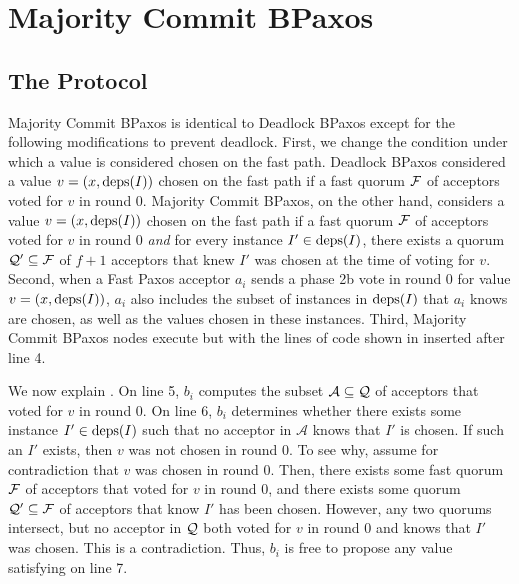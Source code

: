 \section{Majority Commit BPaxos}
\subsection{The Protocol}
Majority Commit BPaxos is identical to Deadlock BPaxos except for the following
modifications to prevent deadlock.
%
First, we change the condition under which a value is considered chosen on the
fast path.
%
Deadlock BPaxos considered a value $v = (x, \text{deps}(I))$ chosen on the fast path
if a fast quorum $\mathcal{F}$ of acceptors voted for $v$ in round $0$.
%
Majority Commit BPaxos, on the other hand, considers a value $v = (x,
\text{deps}(I))$ chosen on the fast path if a fast quorum $\mathcal{F}$ of acceptors
voted for $v$ in round $0$ \emph{and} for every instance $I' \in \text{deps}(I)$,
there exists a quorum $\mathcal{Q}' \subseteq \mathcal{F}$ of $f + 1$ acceptors
that knew $I'$ was chosen at the time of voting for $v$.
%
Second, when a Fast Paxos acceptor $a_i$ sends a phase 2b vote in round $0$ for
value $v = (x, \text{deps}(I))$, $a_i$ also includes the subset of instances in
$\text{deps}(I)$ that $a_i$ knows are chosen, as well as the values chosen in these
instances.
%
Third, Majority Commit BPaxos nodes execute  but with
the lines of code shown in  inserted after line
4.



We now explain . On line 5, $b_i$ computes the
subset $\mathcal{A} \subseteq \mathcal{Q}$ of acceptors that voted for $v$ in round
$0$. On line 6, $b_i$ determines whether there exists some instance $I' \in
\text{deps}(I)$ such that no acceptor in $\mathcal{A}$ knows that $I'$ is chosen. If
such an $I'$ exists, then $v$ was not chosen in round $0$. To see why, assume
for contradiction that $v$ was chosen in round $0$. Then, there exists some
fast quorum $\mathcal{F}$ of acceptors that voted for $v$ in round $0$, and
there exists some quorum $\mathcal{Q}' \subseteq \mathcal{F}$ of acceptors that
know $I'$ has been chosen. However, any two quorums intersect, but no acceptor
in $\mathcal{Q}$ both voted for $v$ in round $0$ and knows that $I'$ was chosen.
This is a contradiction. Thus, $b_i$ is free to propose any value satisfying
 on line 7.


